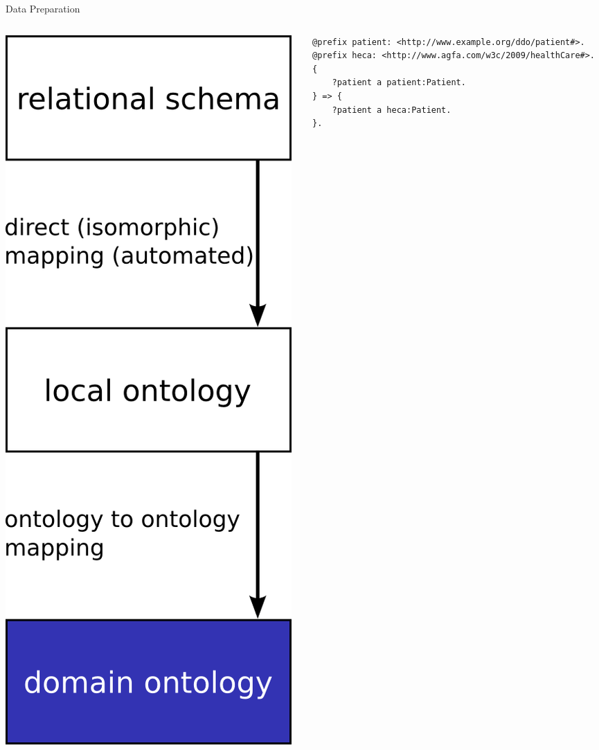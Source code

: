 \documentclass{beamer}
\begin{document}
\begin{frame}[fragile]{Data Preparation}
\begin{columns}
\begin{column}{.3\textwidth}
\includegraphics[width=\textwidth,height=.88\textheight,keepaspectratio]{g3}
\end{column}%
\hfill%
\begin{column}{.66\textwidth}
{\tiny
\begin{verbatim}
@prefix patient: <http://www.example.org/ddo/patient#>.
@prefix heca: <http://www.agfa.com/w3c/2009/healthCare#>.
{
    ?patient a patient:Patient.
} => {
    ?patient a heca:Patient.
}.


\end{verbatim}}
\end{column}
\end{columns}
\end{frame}
\end{document}
